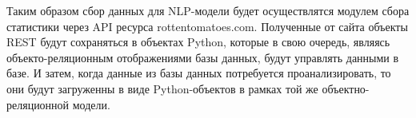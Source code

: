 Таким образом сбор данных для NLP-модели будет осуществлятся модулем сбора статистики через API ресурса rottentomatoes.com. Полученные от сайта объекты REST будут сохраняться в объектах Python, которые в свою очередь, являясь объекто-реляционным отображениями базы данных, будут управлять данными в базе. И затем, когда данные из базы данных потребуется проанализировать, то они будут загруженны в виде Python-объектов в рамках той же объектно-реляционной модели.